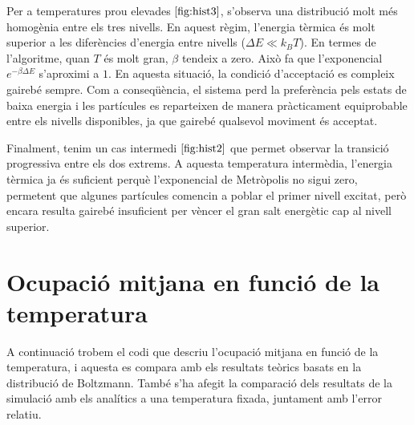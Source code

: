 \documentclass[a4paper,10.5pt]{report}
\begin{document}
Per a temperatures prou elevades $\ref{fig:hist3}$, s'observa una distribució molt més homogènia entre els tres nivells. En aquest règim, l'energia tèrmica és molt superior a les diferències d'energia entre nivells ($\Delta E \ll k_B T$). En termes de l'algoritme, quan $T$ és molt gran, $\beta$ tendeix a zero. Això fa que l'exponencial $e^{-\beta \Delta E}$ s'aproximi a $1$. En aquesta situació, la condició d'acceptació es compleix gairebé sempre. Com a conseqüència, el sistema perd la preferència pels estats de baixa energia i les partícules es reparteixen de manera pràcticament equiprobable entre els nivells disponibles, ja que gairebé qualsevol moviment és acceptat.

Finalment, tenim un cas intermedi $\ref{fig:hist2}$ que permet observar la transició progressiva entre els dos extrems. A aquesta temperatura intermèdia, l'energia tèrmica ja és suficient perquè l'exponencial de Metròpolis no sigui zero, permetent que algunes partícules comencin a poblar el primer nivell excitat, però encara resulta gairebé insuficient per vèncer el gran salt energètic cap al nivell superior. 

\section{Ocupació mitjana en funció de la temperatura}

A continuació trobem el codi que descriu l'ocupació mitjana en funció de la temperatura, i aquesta es compara amb els resultats teòrics basats en la distribució de Boltzmann. També s'ha afegit la comparació dels resultats de la simulació amb els analítics a una temperatura fixada, juntament amb l'error relatiu. 
\end{document}
